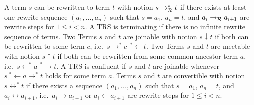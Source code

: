 
\begin{definition}
	A term $s$ can be rewritten to term $t$ with notion $s\rightarrow^*_{\mathcal R} t$ 
	if there exists at least one {\myem rewrite sequence} $(a_1,\ldots ,a_n)$ such that
	$s=a_1$, $a_n=t$, and $a_i\rightarrow_{\mathcal R} a_{i+1}$ are rewrite steps for $1\leq i<n$.
	A TRS is {\myem terminating} if there is no infinite rewrite sequence of terms.
	Two Terms $s$ and $t$ are {\myem joinable} with notion $s\downarrow t$ 
	if both can be rewritten to some term $c$, i.e.~$s \rightarrow^*c\ \, ^*\!\!\leftarrow t$.
%	
	Two Terms $s$ and $t$ are {\myem meetable} with notion $s\uparrow t$ 
	if both can be rewritten from some common ancestor term $a$, i.e.~$s \leftarrow^*a\ \, ^*\!\!\rightarrow t$.
%
	A TRS is {\myem confluent } if $s$ and $t$ are joinable whenever $s\ ^*\!\!\leftarrow a \rightarrow^* t$ holds for some term $a$.
	Terms $s$ and $t$ are {\myem convertible} with notion $s\leftrightarrow^* t$ 
	if there exists a sequence $(a_1,\ldots ,a_n)$ such that
	$s=a_1$, $a_n=t$, and $a_i\leftrightarrow a_{i+1}$, i.e.~$a_i\rightarrow a_{i+1}$ or $a_i\leftarrow a_{i+1}$ are rewrite steps for $1\leq i<n$.
\end{definition}

